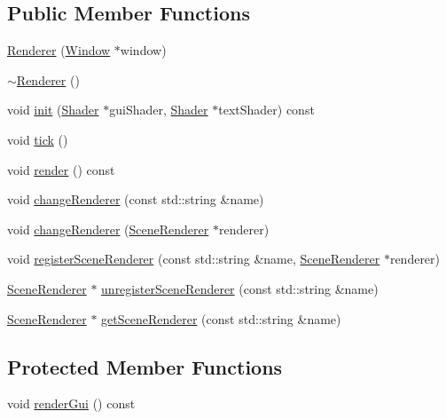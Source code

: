 \subsection*{Public Member Functions}
\begin{DoxyCompactItemize}
\item 
\mbox{\hyperlink{classec_1_1_renderer_a97bc5e3d5050aa98a24fec3669eab28b}{Renderer}} (\mbox{\hyperlink{classec_1_1_window}{Window}} $\ast$window)
\item 
\mbox{\hyperlink{classec_1_1_renderer_ab0a97bd174127b670899477a576d1fe6}{$\sim$\+Renderer}} ()
\item 
void \mbox{\hyperlink{classec_1_1_renderer_acfa2ed0fd23f3f6e36de59302a0148ad}{init}} (\mbox{\hyperlink{classec_1_1_shader}{Shader}} $\ast$gui\+Shader, \mbox{\hyperlink{classec_1_1_shader}{Shader}} $\ast$text\+Shader) const
\item 
void \mbox{\hyperlink{classec_1_1_renderer_a6dcc619251e6e4ec7f088567cba6fd57}{tick}} ()
\item 
void \mbox{\hyperlink{classec_1_1_renderer_a7ff2c9444ad5da2a6db3331f19cb12f9}{render}} () const
\item 
void \mbox{\hyperlink{classec_1_1_renderer_abb876cb59df2478b52926782e2d0a0a9}{change\+Renderer}} (const std\+::string \&name)
\item 
void \mbox{\hyperlink{classec_1_1_renderer_aff1e2f129ce6b24a5ed1e27730a13762}{change\+Renderer}} (\mbox{\hyperlink{classec_1_1_scene_renderer}{Scene\+Renderer}} $\ast$renderer)
\item 
void \mbox{\hyperlink{classec_1_1_renderer_a5e40791070a8fcb7250b4544bdac8725}{register\+Scene\+Renderer}} (const std\+::string \&name, \mbox{\hyperlink{classec_1_1_scene_renderer}{Scene\+Renderer}} $\ast$renderer)
\item 
\mbox{\hyperlink{classec_1_1_scene_renderer}{Scene\+Renderer}} $\ast$ \mbox{\hyperlink{classec_1_1_renderer_a5c853ee4c34b069cc8142db8409abac6}{unregister\+Scene\+Renderer}} (const std\+::string \&name)
\item 
\mbox{\hyperlink{classec_1_1_scene_renderer}{Scene\+Renderer}} $\ast$ \mbox{\hyperlink{classec_1_1_renderer_ab4e0c57f9d1f061f97e1fa188d52c477}{get\+Scene\+Renderer}} (const std\+::string \&name)
\end{DoxyCompactItemize}
\subsection*{Protected Member Functions}
\begin{DoxyCompactItemize}
\item 
void \mbox{\hyperlink{classec_1_1_renderer_a7dcfbdfd04d48452aba34a591b48341f}{render\+Gui}} () const
\end{DoxyCompactItemize}
